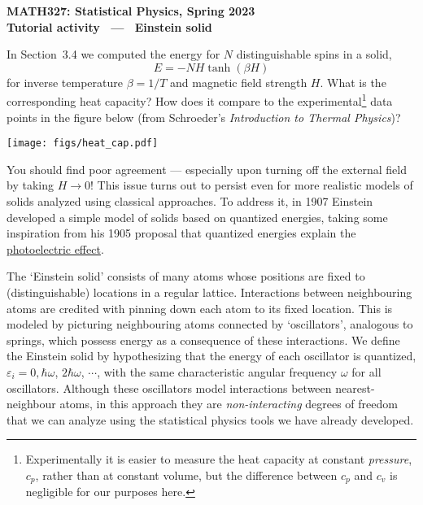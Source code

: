 \documentclass[12 pt]{article} %
\newcommand{\be}{\ensuremath{\beta} }
\newcommand{\eps}{\ensuremath{\varepsilon} }
\newcommand{\om}{\ensuremath{\omega} }
\begin{document}
\newcommand{\thisunit}{MATH327 Tutorial (Solid)}
\newcommand{\moddate}{Last modified 22 Mar.~2023}
\begin{center}
  {\Large \textbf{MATH327: Statistical Physics, Spring 2023}} \\[12 pt]
  {\Large \textbf{Tutorial activity \ --- \ Einstein solid}} \\[24 pt]
\end{center}

In Section~3.4 we computed the energy for $N$ distinguishable spins in a solid,
\begin{equation*}
  E = -NH\tanh(\be H)
\end{equation*}
for inverse temperature $\be = 1 / T$ and magnetic field strength $H$.
What is the corresponding heat capacity?
How does it compare to the experimental\footnote{Experimentally it is easier to measure the heat capacity at constant \textit{pressure}, $c_p$, rather than at constant volume, but the difference between $c_p$ and $c_v$ is negligible for our purposes here.} data points in the figure below (from Schroeder's \textit{Introduction to Thermal Physics})?

\begin{center}\texttt{[image: figs/heat\_cap.pdf]}\end{center}

You should find poor agreement --- especially upon turning off the external field by taking $H \to 0$!
This issue turns out to persist even for more realistic models of solids analyzed using classical approaches.
To address it, in 1907 Einstein developed a simple model of solids based on quantized energies, taking some inspiration from his 1905 proposal that quantized energies explain the \href{https://en.wikipedia.org/wiki/Photoelectric_effect}{photoelectric effect}.

The `Einstein solid' consists of many atoms whose positions are fixed to (distinguishable) locations in a regular lattice.
Interactions between neighbouring atoms are credited with pinning down each atom to its fixed location.
This is modeled by picturing neighbouring atoms connected by `oscillators', analogous to springs, which possess energy as a consequence of these interactions.
We define the Einstein solid by hypothesizing that the energy of each oscillator is quantized, $\eps_i = 0, \hbar \om$, $2\hbar \om$, $\cdots$, with the same characteristic angular frequency \om for all oscillators.
Although these oscillators model interactions between nearest-neighbour atoms, in this approach they are \textit{non-interacting} degrees of freedom that we can analyze using the statistical physics tools we have already developed.
\end{document}
